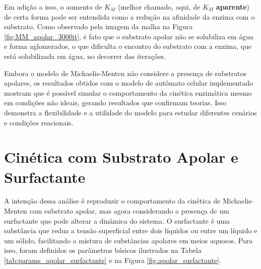 \documentclass[12pt,oneside]{report}
\begin{document}
Em adição a isso, o aumento de $K_M$ (melhor chamado, aqui, de $K_M$ \textbf{aparente}) de certa forma pode ser entendida como a redução na afinidade da enzima com o substrato. Como observado pela imagem da malha na Figura \ref{fig:MM_apolar_3000it}, é fato que o substrato apolar não se solubiliza em água e forma aglomerados, o que dificulta o encontro do substrato com a enzima, que está solubilizada em água, no decorrer das iterações.

Embora o modelo de Michaelis-Menten não considere a presença de substratos apolares, os resultados obtidos com o modelo de autômato celular implementado mostram que é possível simular o comportamento da cinética enzimática mesmo em condições não ideais, gerando resultados que confirmam teorias. Isso demonstra a flexibilidade e a utilidade do modelo para estudar diferentes cenários e condições reacionais.

\section{Cinética com Substrato Apolar e Surfactante}

A intenção dessa análise é reproduzir o comportamento da cinética de Michaelis-Menten com substrato apolar, mas agora considerando a presença de um surfactante que pode alterar a dinâmica do sistema. O surfactante é uma substância que reduz a tensão superficial entre dois líquidos ou entre um líquido e um sólido, facilitando a mistura de substâncias apolares em meios aquosos. Para isso, foram definidos os parâmetros básicos ilustrados na Tabela \ref{tab:params_apolar_surfactante} e na Figura \ref{fig:apolar_surfactante}.
\end{document}
